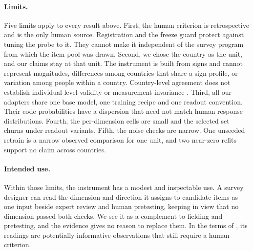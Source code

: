 \paragraph{Limits.} Five limits apply to every result above. First, the human criterion is retrospective and is the only human source. Registration and the freeze guard protect against tuning the probe to it. They cannot make it independent of the survey program from which the item pool was drawn. Second, we chose the country as the unit, and our claims stay at that unit. The instrument is built from signs and cannot represent magnitudes, differences among countries that share a sign profile, or variation among people within a country. Country-level agreement does not establish individual-level validity or measurement invariance \citep{davidov2014,bratt2025}. Third, all our adapters share one base model, one training recipe and one readout convention. Their code probabilities have a dispersion that need not match human response distributions. Fourth, the per-dimension cells are small and the selected set churns under readout variants. Fifth, the noise checks are narrow. One unseeded retrain is a narrow observed comparison for one unit, and two near-zero refits support no claim across countries.

\paragraph{Intended use.} Within those limits, the instrument has a modest and inspectable use. A survey designer can read the dimension and direction it assigns to candidate items as one input beside expert review and human pretesting, keeping in view that no dimension passed both checks. We see it as a complement to fielding and pretesting, and the evidence gives no reason to replace them. In the terms of \citet{broska2025}, its readings are potentially informative observations that still require a human criterion.
